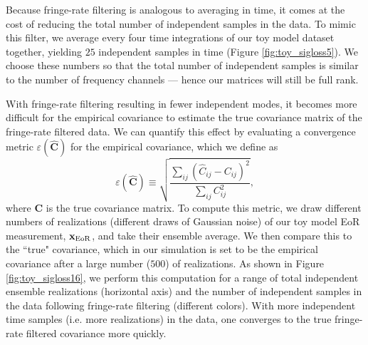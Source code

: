\documentclass[preprint2,numberedappendix,tighten]{aastex6}  %
\newcommand{\C}{\mathbf{C}}
\newcommand{\Chat}{\mathbf{\widehat{C}}}
\newcommand{\cc}[1]{{\color{purple} \textbf{[CC: #1]}}}
\begin{document}
Because fringe-rate filtering is analogous to averaging in time, it comes at the cost of reducing the total number of independent samples in the data. To mimic this filter, we average every four time integrations of our toy model dataset together, yielding $25$ independent samples in time (Figure \ref{fig:toy_sigloss5}). We choose these numbers so that the total number of independent samples is similar to the number of frequency channels --- hence our matrices will still be full rank.

With fringe-rate filtering resulting in fewer independent modes, it becomes more difficult for the empirical covariance to estimate the true covariance matrix of the fringe-rate filtered data. We can quantify this effect by evaluating a convergence metric $\varepsilon(\Chat)$ for the empirical covariance, which we define as
\begin{equation}
\label{eq:converge}
\varepsilon (\Chat) \equiv \sqrt{\frac{\sum_{ij} (\widehat{C}_{ij} - {C}_{ij})^2}{\sum_{ij} {C}_{ij}^2}},
\end{equation}
where $\C$ is the true covariance matrix. To compute this metric, we draw different numbers of realizations (different draws of Gaussian noise) of our toy model EoR measurement, $\textbf{x}_{\rm EoR}$, and take their ensemble average. We then compare this to the ``true" covariance, which in our simulation is set to be the empirical covariance after a large number ($500$) of realizations. As shown in Figure \ref{fig:toy_sigloss16}, we perform this computation for a range of total independent ensemble realizations (horizontal axis) and the number of independent samples in the data following fringe-rate filtering (different colors). With more independent time samples (i.e. more realizations) in the data, one converges to the true fringe-rate filtered covariance more quickly. 
\end{document}
